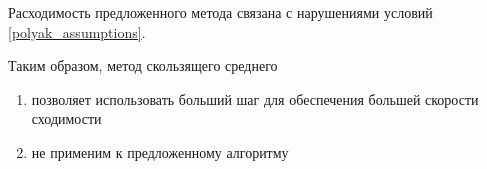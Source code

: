 Расходимость предложенного метода связана с нарушениями условий \ref{polyak_assumptions}.

Таким образом, метод скользящего среднего \begin{enumerate}
    \item позволяет использовать больший шаг для обеспечения большей скорости сходимости
    \item не применим к предложенному алгоритму
\end{enumerate}